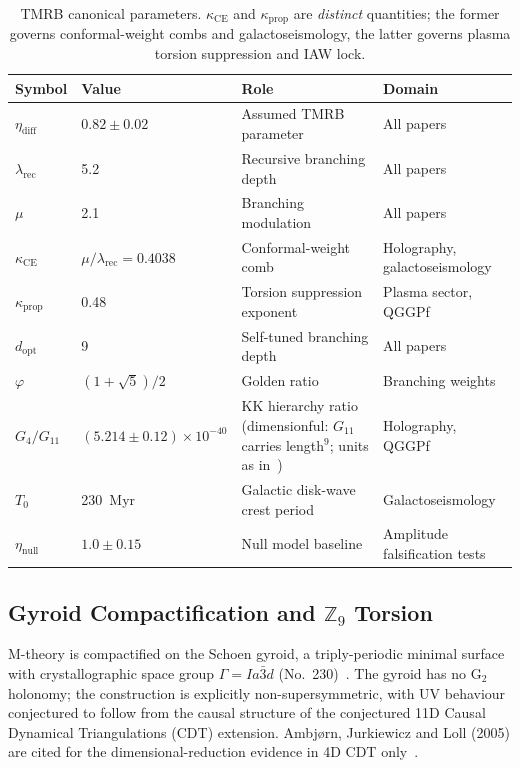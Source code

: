 \documentclass[11pt,a4paper]{article}
\begin{document}
\begin{table}[ht]
\centering
\caption{TMRB canonical parameters. $\kappa_{\mathrm{CE}}$ and $\kappa_{\mathrm{prop}}$
are \emph{distinct} quantities; the former governs conformal-weight combs and
galactoseismology, the latter governs plasma torsion suppression and IAW lock.}
\label{tab:params}
\begin{tabular}{llp{4.0cm}l}
\toprule
Symbol & Value & Role & Domain \\
\midrule
$\eta_{\mathrm{diff}}$ & $0.82\pm0.02$ & Assumed TMRB parameter & All papers \\
$\lambda_{\mathrm{rec}}$ & 5.2 & Recursive branching depth & All papers \\
$\mu$ & 2.1 & Branching modulation & All papers \\
$\kappa_{\mathrm{CE}}$ & $\mu/\lambda_{\mathrm{rec}} = 0.4038$ & Conformal-weight comb & Holography, galactoseismology \\
$\kappa_{\mathrm{prop}}$ & 0.48 & Torsion suppression exponent & Plasma sector, QGGPf \\
$d_{\mathrm{opt}}$ & 9 & Self-tuned branching depth & All papers \\
$\varphi$ & $(1+\sqrt{5})/2$ & Golden ratio & Branching weights \\
$G_4/G_{11}$ & $(5.214\pm0.12)\times10^{-40}$ & KK hierarchy ratio (dimensionful: $G_{11}$ carries length$^9$; units as in~\cite{BresslerBGL2026}) & Holography, QGGPf \\
$T_0$ & 230~Myr & Galactic disk-wave crest period & Galactoseismology \\
$\eta_{\mathrm{null}}$ & $1.0\pm0.15$ & Null model baseline & Amplitude falsification tests \\
\bottomrule
\end{tabular}
\end{table}

\subsection{Gyroid Compactification and $\mathbb{Z}_9$ Torsion}

M-theory is compactified on the Schoen gyroid, a triply-periodic minimal surface
with crystallographic space group $\Gamma = Ia\bar{3}d$ (No.~230)~\cite{Schoen1970}.
The gyroid has no G$_2$ holonomy; the construction is explicitly
non-supersymmetric, with UV behaviour conjectured to follow from the causal structure of the
conjectured 11D Causal Dynamical Triangulations (CDT) extension.
Ambj{\o}rn, Jurkiewicz and Loll (2005) are cited for the dimensional-reduction evidence in 4D CDT only~\cite{AJL2005}.
\end{document}
